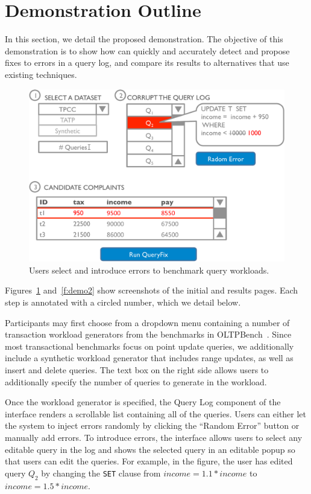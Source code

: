 \section{Demonstration Outline}
\label{sec:demo}

In this section, we detail the proposed demonstration. The objective
of this demonstration is to show how \sys can quickly and accurately detect 
and propose fixes to errors in a query log, and compare its results to alternatives
that use existing techniques.


\begin{figure}[h]
\centering
  \includegraphics[width = .75\columnwidth]{figures/demo1_exp2}
  \caption{Users select and introduce errors to benchmark query workloads.}
  \label{f:demo1} 
\end{figure}

Figures~\ref{f:demo1} and~\ref{f:demo2} show screenshots of the initial and results pages.
Each step is annotated with a circled number, which we detail below.

 Participants may first choose from a dropdown menu containing
a number of transaction workload generators from the benchmarks in OLTPBench~\cite{oltpbench}.
Since most transactional benchmarks focus on point update queries, we additionally include a 
synthetic workload generator that includes range updates, as well as insert and delete queries.
The text box on the right side allows users to additionally specify the number of queries to generate
in the workload.  

Once the workload generator is specified, the Query Log component of the interface
renders a scrollable list containing all of the queries.  Users can either let the system to 
inject errors randomly by clicking the ``Random Error'' button or manually add errors. 
To introduce errors, the interface allows users to select any editable query in the log and shows the 
selected query in an editable popup so that users can edit the queries.  
For example, in the figure, the user has edited query $Q_2$ by changing the \texttt{SET}
clause from $income = 1.1 * income$ to $income = 1.5 * income$. 

